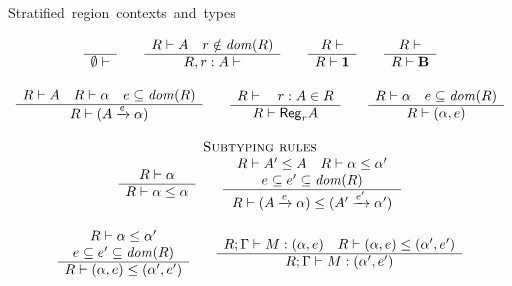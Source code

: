 \documentclass[11pt]{article}
\newcommand{\Gives}{\vdash}             \newcommand{\IGives}{\vdash_{I}}        \newcommand{\AIGives}{\vdash_{{\it AI}}} \newcommand{\CGives}{\vdash_{C}}
\newcommand{\behtype}{{\bf B}}
\newcommand{\infer}[2]{\begin{array}{c} #1 \\ \hline #2 \end{array}}
\newcommand{\act}[1]{\xrightarrow{#1}}
\newcommand{\regtype}[2]{{\sf Reg}_{#1} #2}
\begin{document}
\begin{table}
{\footnotesize
\begin{center}
\mbox{{\sc Stratified region contexts and types}}  \\
\end{center}
\[
\begin{array}{c}

\infer{}{\emptyset \Gives}

\qquad

\infer{R\Gives A\quad r\notin \w{dom}(R)}
{R,r:A\Gives} 
\qquad

\infer{R\Gives}
{R\Gives \tertype} 

\qquad

\infer{R\Gives}
{R\Gives \behtype}
\\ \\ 

\infer{R\Gives A\quad R\Gives \alpha \quad e\subseteq \w{dom}(R)}
{R\Gives (A\act{e} \alpha)} 

\qquad

\infer{R\Gives \quad r:A \in R}
{R\Gives \regtype{r}{A}} 

\qquad

\infer{R\Gives \alpha \quad e\subseteq\w{dom}(R)}
{R\Gives (\alpha,e)} \\  \\

\mbox{{\sc Subtyping rules}} \\

\infer{R\Gives \alpha}{R\Gives \alpha \leq \alpha}

\qquad

\infer{\begin{array}{c}
R\Gives A'\leq A\quad  R\Gives \alpha \leq \alpha'\\
e\subseteq e' \subseteq \w{dom}(R) 
\end{array}}
{R\Gives (A\act{e} \alpha) \leq (A' \act{e'} \alpha')} 

\\ \\

\infer{\begin{array}{c}
R\Gives \alpha \leq \alpha'\\ 
e\subseteq e' \subseteq \w{dom}(R)
\end{array}}
{R\Gives (\alpha,e) \leq (\alpha',e')} 

\qquad

\infer{R;\Gamma \Gives M:(\alpha,e) \quad R\Gives (\alpha,e)\leq (\alpha',e')}
{R;\Gamma \Gives M:(\alpha',e')} 


\end{array}\]}
\end{table}
\end{document}
